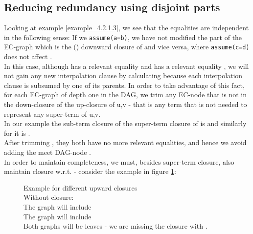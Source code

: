 \subsection*{Reducing redundancy using disjoint parts}
Looking at example \ref{example_4.2.1.3}, we see that the equalities  are independent in the following sense:
If we \lstinline|assume(a=b)|, we have not modified the part of the EC-graph which is the (\GFA{}) downward closure of \m{[e_3],[e_4]} and vice versa, where \lstinline|assume(c=d)| does not affect \m{[e_1],[e_2]}.\\
In this case, although  has a relevant equality  and  has a relevant equality , we will not gain any new interpolation clause by calculating  because each interpolation clause is subsumed by one of its parents.
In order to take advantage of this fact, for each EC-graph  of depth one in the DAG, we trim any EC-node that is not in the down-closure of the up-closure of u,v - that is any term that is not needed to represent any super-term of u,v.\\
In our example the sub-term closure of the super-term closure of \s{[a],[b]} is \s{[a],[b],[e_1],[e_2],[\textcolor{red}{x}]} 
and similarly for \s{[c],[d]} it is \s{[c],[d],[e_3],[e_4],[\textcolor{red}{x}]}.\\
After trimming , they both have no more relevant equalities, and hence we avoid adding the meet DAG-node .\\
In order to maintain completeness, we must, besides super-term closure, also maintain closure w.r.t. \eqg - consider the example in figure \ref{example_4.2.1.6}:
\begin{figure}[H]
\caption{Example for different upward closures\\
Without \eqg closure:\\
The graph  will include \s{[a],[b],[c],[\textcolor{red}{x}],[\textcolor{red}{y_0},\textcolor{red}{y_1}]}\\
The graph  will include \s{[b],[c],[d],[\textcolor{red}{x}],[\textcolor{red}{y_1},\textcolor{red}{y_2}]}\\
Both graphs will be leaves - we are missing the closure with \m{\textcolor{red}{y_0} \eqg \textcolor{red}{y_2}}.
}
\label{example_4.2.1.6}
\end{figure}


